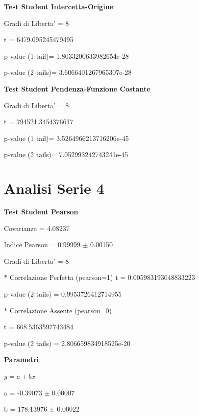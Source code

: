 \documentclass{article}
\begin{document}
\textbf{Test Student Intercetta-Origine}

Gradi di Liberta' = 8

t = 6479.095245479495

p-value (1 tail)= 1.8033200633982654e-28

p-value (2 tails)= 3.6066401267965307e-28

\textbf{Test Student Pendenza-Funzione Costante}

Gradi di Liberta' = 8

t = 794521.3454376617

p-value (1 tail)= 3.5264966213716206e-45

p-value (2 tails)= 7.052993242743241e-45

\section*{Analisi Serie 4}

\textbf{Test Student Pearson}

Covarianza = 4.08237

Indice Pearson = 0.99999 $\pm$ 0.00150

Gradi di Liberta' = 8

$\ast$ Correlazione Perfetta (pearson=1)
t = 0.005983193048833223

p-value (2 tails) = 0.9953726412714955

$\ast$ Correlazione Assente (pearson=0)

t = 668.5363597743484

p-value (2 tails) = 2.806659834918525e-20

\textbf{Parametri}

$y = a + bx$

a = -0.39073 $\pm$ 0.00007

b = 178.13976 $\pm$ 0.00022
\end{document}
